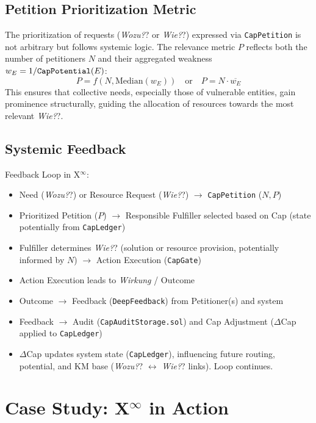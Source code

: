 \documentclass[12pt, a4paper]{scrartcl}
\newcommand{\Xinf}{X$^\infty$}                        %
\newcommand{\DeltaCap}{$\Delta$Cap}                    %
\newcommand{\CapPotential}{\texttt{CapPotential}}    %
\newcommand{\CapLedger}{\texttt{CapLedger}}          %
\newcommand{\Wirkung}{\textit{Wirkung}}                 %
\newcommand{\CapGate}{\texttt{CapGate}}
\newcommand{\CapAuditStorage}{\texttt{CapAuditStorage.sol}}
\newcommand{\CapPetition}{\texttt{CapPetition}}        %
\newcommand{\Wozu}{\textit{Wozu?}}                      %
\newcommand{\Wie}{\textit{Wie?}}                        %
\begin{document}
\subsection{Petition Prioritization Metric}

The prioritization of requests (\Wozu? or \Wie?) expressed via \CapPetition{} is not arbitrary but follows systemic logic. The relevance metric $P$ reflects both the number of petitioners $N$ and their aggregated weakness $w_E = 1/\text{\CapPotential{}}(E)$: %
\[ P = f(N, \text{Median}(w_E)) \quad \text{or} \quad P = N \cdot \overline{w_E} \]
This ensures that collective needs, especially those of vulnerable entities, gain prominence structurally, guiding the allocation of resources towards the most relevant \Wie?.

\subsection{Systemic Feedback}

Feedback Loop in \Xinf{}:
\begin{itemize}
    \item Need (\Wozu?) or Resource Request (\Wie?) $\rightarrow$ \CapPetition{} ($N, P$)
    \item Prioritized Petition ($P$) $\rightarrow$ Responsible Fulfiller selected based on Cap (state potentially from \CapLedger{})
    \item Fulfiller determines \Wie? (solution or resource provision, potentially informed by $N$) $\rightarrow$ Action Execution (\CapGate{})
    \item Action Execution leads to \Wirkung{} / Outcome
    \item Outcome $\rightarrow$ Feedback (\texttt{DeepFeedback}) from Petitioner(s) and system
    \item Feedback $\rightarrow$ Audit (\CapAuditStorage{}) and Cap Adjustment (\DeltaCap{} applied to \CapLedger{})
    \item \DeltaCap{} updates system state (\CapLedger{}), influencing future routing, potential, and KM base (\Wozu? $\leftrightarrow$ \Wie? links). Loop continues.
\end{itemize}


\section{Case Study: \Xinf{} in Action}
\end{document}
